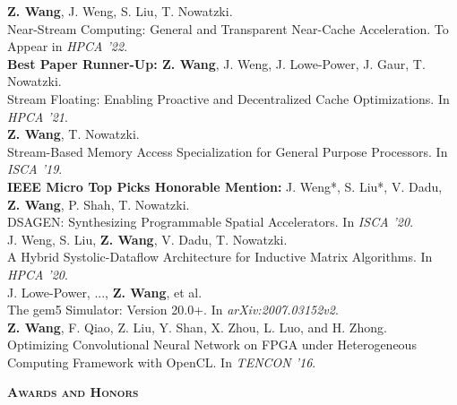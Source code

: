 \documentclass[a4paper]{article}
\newenvironment{changemargin}[2]{%
  \begin{list}{}{%
    \setlength{\topsep}{0pt}%
    \setlength{\leftmargin}{#1}%
    \setlength{\rightmargin}{#2}%
    \setlength{\listparindent}{\parindent}%
    \setlength{\itemindent}{\parindent}%
    \setlength{\parsep}{\parskip}%
  }%
  \item[]}{\end{list}
}
\newcommand{\lineover}{
	\begin{changemargin}{-0.05in}{-0.05in}
		\vspace*{-8pt}
		\hrulefill \\
		\vspace*{-2pt}
	\end{changemargin}
}
\newcommand{\header}[1]{
	\begin{changemargin}{-0.5in}{-0.5in}
		\scshape{\textbf{#1}}\\
  	\lineover
	\end{changemargin}
}
\newenvironment{body} {
	\vspace*{-16pt}
	\begin{changemargin}{-0.25in}{-0.5in}
  }	
	{\end{changemargin}
}
\begin{document}
\begin{body}
	\vspace{14pt}
	\textbf{Z. Wang}, J. Weng, S. Liu, T. Nowatzki. \\
	Near-Stream Computing: General and Transparent Near-Cache Acceleration. To Appear in \emph{HPCA '22}.\\
	\smallskip
	\textbf{Best Paper Runner-Up: Z. Wang}, J. Weng, J. Lowe-Power, J. Gaur, T. Nowatzki. \\
	Stream Floating: Enabling Proactive and Decentralized Cache Optimizations. In \emph{HPCA '21}.\\
	\smallskip
	\textbf{Z. Wang}, T. Nowatzki. \\
	Stream-Based Memory Access Specialization for General Purpose Processors. In \emph{ISCA '19}.\\
	\smallskip
	\textbf{IEEE Micro Top Picks Honorable Mention:} J. Weng*, S. Liu*, V. Dadu, \textbf{Z. Wang}, P. Shah, T. Nowatzki. \\
	DSAGEN: Synthesizing Programmable Spatial Accelerators. In \emph{ISCA '20}.\\
	\smallskip
	J. Weng, S. Liu, \textbf{Z. Wang}, V. Dadu, T. Nowatzki. \\
	A Hybrid Systolic-Dataflow Architecture for Inductive Matrix Algorithms. In \emph{HPCA '20}.\\
	\smallskip
	J. Lowe-Power, ..., \textbf{Z. Wang}, et al. \\
	The gem5 Simulator: Version 20.0+. In \emph{arXiv:2007.03152v2}.\\
	\smallskip
	\textbf{Z. Wang}, F. Qiao, Z. Liu, Y. Shan, X. Zhou, L. Luo, and H. Zhong. \\
	Optimizing Convolutional Neural Network on FPGA under Heterogeneous Computing Framework with OpenCL. In \emph{TENCON '16}.\\
\end{body}

\smallskip
\smallskip


\header{Awards and Honors}
\end{document}
